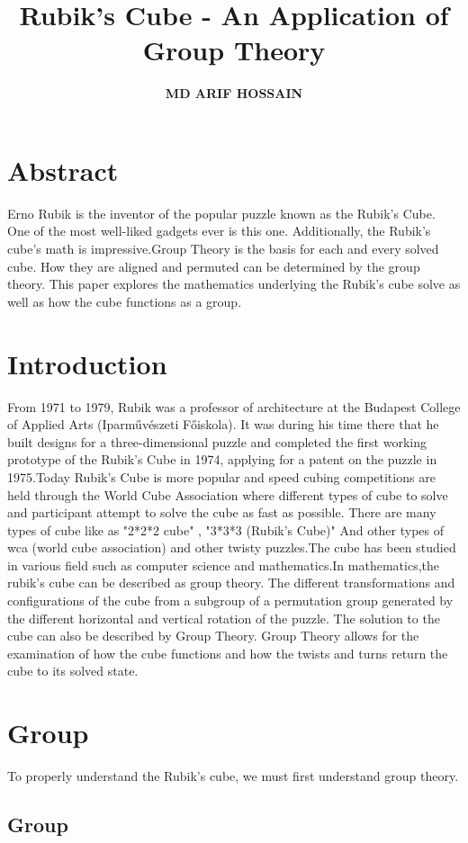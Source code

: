 \documentclass{article}
\author{\textbf{MD ARIF HOSSAIN}}
\title{\textbf {Rubik's Cube - An Application of Group Theory}}
\date{}
\begin{document}
\maketitle

   \section*{Abstract} 
 Erno Rubik is the inventor of the popular puzzle known as the Rubik's Cube. One of the most well-liked gadgets ever is this one. Additionally, the Rubik's cube's math is impressive.Group Theory is the basis for each and every solved cube. How they are aligned and permuted can be determined by the group theory. This paper explores the mathematics underlying the Rubik's cube solve as well as how the cube functions as a group.
 \section{Introduction}
From 1971 to 1979, Rubik was a professor of architecture at the Budapest College of Applied Arts (Iparművészeti Főiskola). It was during his time there that he built designs for a three-dimensional puzzle and completed the first working prototype of the Rubik's Cube in 1974, applying for a patent on the puzzle in 1975.Today Rubik's Cube is more popular and speed cubing competitions are held through the World Cube Association where different types of cube to solve and participant attempt to solve the cube as fast as possible. There are many types of cube like as "2*2*2 cube" , "3*3*3 (Rubik's Cube)" And other types of wca (world cube association) and other twisty puzzles.\cite{demaine2011algorithms}The cube has been studied in various field such as computer science and mathematics.In mathematics,the rubik's cube can be described as group theory. The different transformations and configurations of the cube from a subgroup of a permutation group generated by the different horizontal and vertical rotation of the puzzle.\cite{demaine2011algorithms}
The solution to the cube can also be described by Group
Theory.\cite{joyner2008adventures}
Group Theory allows for the examination of how the cube functions and
how the twists and turns return the cube to its solved state.

\section{Group}
To properly understand the Rubik's cube, we must first understand group theory.
\subsection{Group}
\end{document}
